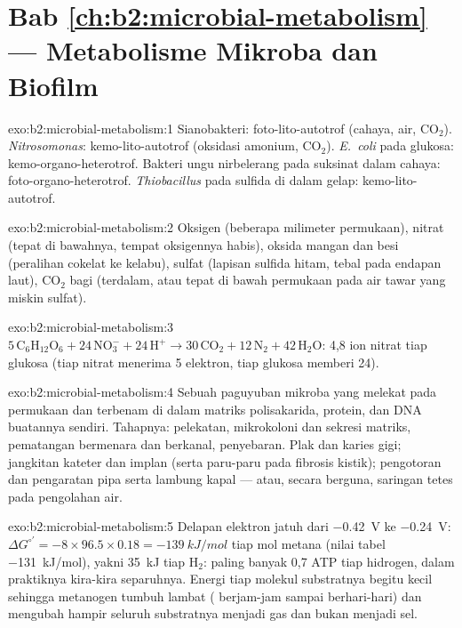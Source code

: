 \section*{Bab \ref{ch:b2:microbial-metabolism} --- Metabolisme Mikroba dan Biofilm}

\begin{solution}{exo:b2:microbial-metabolism:1}
Sianobakteri: foto-lito-autotrof (cahaya, air, $\mathrm{CO_2}$).
\emph{Nitrosomonas}: kemo-lito-autotrof (oksidasi amonium,
$\mathrm{CO_2}$). \emph{E.~coli} pada glukosa: kemo-organo-heterotrof.
Bakteri ungu nirbelerang pada suksinat dalam cahaya:
foto-organo-heterotrof. \emph{Thiobacillus} pada sulfida di dalam
gelap: kemo-lito-autotrof.
\end{solution}

\begin{solution}{exo:b2:microbial-metabolism:2}
Oksigen (beberapa milimeter permukaan), nitrat (tepat di bawahnya,
tempat oksigennya habis), oksida mangan dan besi (peralihan cokelat ke
kelabu), sulfat (lapisan sulfida hitam, tebal pada endapan laut),
$\mathrm{CO_2}$ bagi  (terdalam, atau tepat di bawah
permukaan pada air tawar yang miskin sulfat).
\end{solution}

\begin{solution}{exo:b2:microbial-metabolism:3}
$5\,\mathrm{C_6H_{12}O_6} + 24\,\mathrm{NO_3^-} + 24\,\mathrm{H^+}
\to 30\,\mathrm{CO_2} + 12\,\mathrm{N_2} + 42\,\mathrm{H_2O}$: 4,8
ion nitrat tiap glukosa (tiap nitrat menerima 5 elektron, tiap
glukosa memberi 24).
\end{solution}

\begin{solution}{exo:b2:microbial-metabolism:4}
Sebuah paguyuban mikroba yang melekat pada permukaan dan terbenam di
dalam matriks polisakarida, protein, dan DNA buatannya sendiri.
Tahapnya: pelekatan, mikrokoloni dan sekresi matriks, pematangan
bermenara dan berkanal, penyebaran. Plak dan karies gigi; jangkitan
kateter dan implan (serta paru-paru pada fibrosis kistik); pengotoran
dan pengaratan pipa serta lambung kapal --- atau, secara berguna,
saringan tetes pada pengolahan air.
\end{solution}

\begin{solution}{exo:b2:microbial-metabolism:5}
Delapan elektron jatuh dari \qty{-0.42}{V} ke \qty{-0.24}{V}:
$\Delta G^{\circ\prime} = -8\times 96.5\times 0.18 =
\qty{-139}{kJ/mol}$ tiap mol metana (nilai tabel \qty{-131}{kJ/mol}),
yakni \qty{35}{kJ} tiap $\mathrm{H_2}$: paling banyak 0,7 ATP tiap
hidrogen, dalam praktiknya kira-kira separuhnya. Energi tiap molekul
substratnya begitu kecil sehingga metanogen tumbuh lambat ( berjam-jam sampai berhari-hari) dan mengubah hampir seluruh
substratnya menjadi gas dan bukan menjadi sel.
\end{solution}

